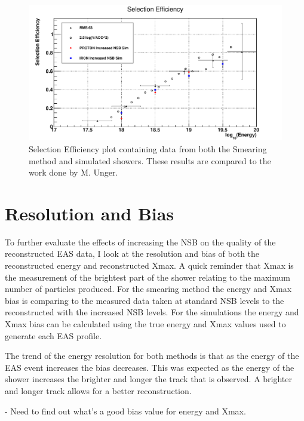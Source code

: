 \begin{figure}[!hp]
\centering
\includegraphics[width=\textwidth]{chapters/graphs/SelectionEff/SelectionEff_errorbars_10timesNSB.pdf}
\caption{Selection Efficiency plot containing data from both the Smearing method and simulated showers. These results are compared to the work done by M. Unger.}
\end{figure}

\section{Resolution and Bias}

To further evaluate the effects of increasing the NSB on the quality of the reconstructed EAS data, I look at the resolution and bias of both the reconstructed energy and reconstructed Xmax. A quick reminder that Xmax is the measurement of the brightest part of the shower relating to the maximum number of particles produced. For the smearing method the energy and Xmax bias is comparing to the measured data taken at standard NSB levels to the reconstructed with the increased NSB levels. For the simulations the energy and Xmax bias can be calculated using the true energy and Xmax values used to generate each EAS profile.

The trend of the energy resolution for both methods is that as the energy of the EAS event increases the bias decreases. This was expected as the energy of the shower increases the brighter and longer the track that is observed. A brighter and longer track allows for a better reconstruction.

- Need to find out what's a good bias value for energy and Xmax.

